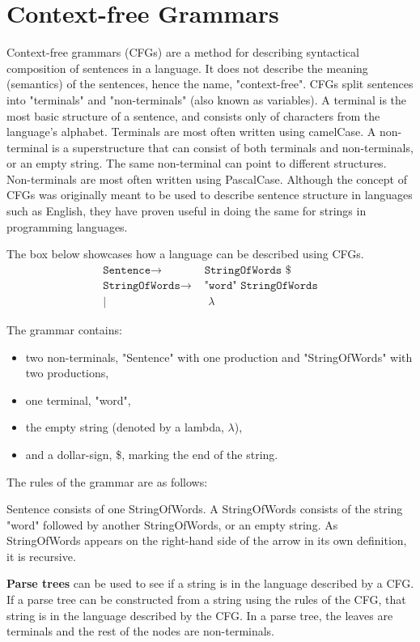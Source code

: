 \section{Context-free Grammars}
\label{CFGdescription}
Context-free grammars (CFGs) are a method for describing syntactical composition of sentences in a language.
It does not describe the meaning (semantics) of the sentences, hence the name, "context-free".
CFGs split sentences into "terminals" and "non-terminals" (also known as variables).
A terminal is the most basic structure of a sentence, and consists only of characters from the language's alphabet.
Terminals are most often written using camelCase.
A non-terminal is a superstructure that can consist of both terminals and non-terminals, or an empty string.
The same non-terminal can point to different structures.
Non-terminals are most often written using PascalCase.
Although the concept of CFGs was originally meant to be used to describe sentence structure in languages such as English, they have proven useful in doing the same for strings in programming languages.
\cite{SebestaGrammar}

The box below showcases how a language can be described using CFGs.
\begin{align*}
	\texttt{Sentence}\to & \texttt{ StringOfWords \$}\\
	\texttt{StringOfWords}\to & \texttt{ "word" StringOfWords}\\
	| & \texttt{ }\lambda
\end{align*}

The grammar contains:
\begin{itemize}
	\item two non-terminals, "Sentence" with one production and "StringOfWords" with two productions,
	\item one terminal, "word",
	\item the empty string (denoted by a lambda, $\lambda$),
	\item and a dollar-sign, \$, marking the end of the string.
\end{itemize}

The rules of the grammar are as follows:

Sentence consists of one StringOfWords. 
A StringOfWords consists of the string "word" followed by another StringOfWords, or an empty string.
As StringOfWords appears on the right-hand side of the arrow in its own definition, it is recursive.

\textbf{Parse trees} can be used to see if a string is in the language described by a CFG.
If a parse tree can be constructed from a string using the rules of the CFG, that string is in the language described by the CFG. 
In a parse tree, the leaves are terminals and the rest of the nodes are non-terminals.
\cite{SebestaParsetrees}

